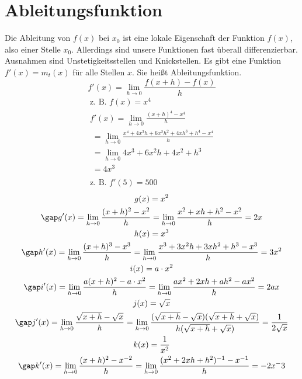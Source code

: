 \section{Ableitungsfunktion}
Die Ableitung von $f(x)$ bei $x_0$ ist eine lokale Eigenschaft der Funktion $f(x)$, also einer Stelle $x_0$. Allerdings sind unsere Funktionen fast überall differenzierbar. Ausnahmen sind Unstetigkeitsstellen und Knickstellen. Es gibt eine Funktion $f'(x) = m_t(x)$ für alle Stellen $x$. Sie heißt Ableitungsfunktion.
$$f'(x) = \lim\limits_{h \to 0} \frac{f(x + h) - f(x)}{h}$$
\begin{gather*}
  \text{z. B. } f(x) = x^4 \\
  f'(x) = \lim\limits_{h \to 0} \frac{(x + h)^4 - x^4}{h} \\
  \;= \lim\limits_{h \to 0} \frac{x^4 + 4x^3h + 6x^2h^2 + 4xh^3 + h^4 - x^4}{h} \\
  \;= \lim\limits_{h \to 0} 4x^3 + 6x^2h + 4x^2 + h^3 \\
  \;= 4x^3 \\\\
  \text{z. B. } f'(5) = 500
\end{gather*}
\begin{gather*}
  g(x) = x^2 \\
  \gap g'(x) = \lim\limits_{h \to 0} \frac{(x + h)^2 - x^2}{h} = \lim\limits_{h \to 0} \frac{x^2 + xh + h^2 - x^2}{h} = 2x \\
  h(x) = x^3 \\
  \gap h'(x) = \lim\limits_{h \to 0} \frac{(x + h)^3 - x^3}{h} = \lim\limits_{h \to 0} \frac{x^3 + 3x^2h + 3xh^2 + h^3 - x^3}{h} = 3x^2 \\
  i(x) = a \cdot x^2 \\
  \gap i'(x) = \lim\limits_{h \to 0} \frac{a(x + h)^2 - a \cdot x^2}{h} = \lim\limits_{h \to 0} \frac{ax^2 + 2xh + ah^2 - ax^2}{h} = 2ax \\
  j(x) = \sqrt{x} \\
  \gap j'(x) = \lim\limits_{h \to 0} \frac{\sqrt{x + h} - \sqrt{x}}{h} = \lim\limits_{h \to 0} \frac{(\sqrt{x + h} - \sqrt{x})(\sqrt{x + h} + \sqrt{x})}{h(\sqrt{x + h} + \sqrt{x})} = \frac{1}{2\sqrt{x}} \\
  k(x) = \frac{1}{x^2} \\
  \gap k'(x) = \lim\limits_{h \to 0} \frac{(x + h)^2 - x^{-2}}{h} = \lim\limits_{h \to 0} \frac{(x^2 + 2xh + h^2)^{-1} - x^{-1}}{h} = -2x^-3
\end{gather*} \\\\
